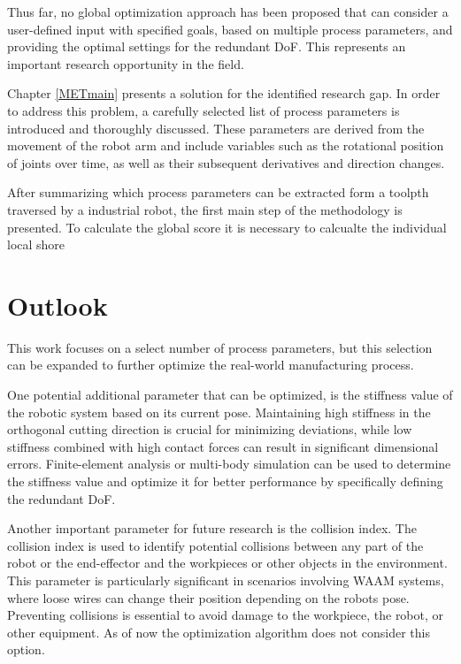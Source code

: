 Thus far, no global optimization approach has been proposed that can consider a user-defined input with specified goals, based on multiple process parameters, and providing the optimal settings for the redundant \acrshort{DoF}. This represents an important research opportunity in the field.

Chapter \ref{METmain} presents a solution for the identified research gap. In order to address this problem, a carefully selected list of process parameters is introduced and thoroughly discussed. These parameters are derived from the movement of the robot arm and include variables such as the rotational position of joints over time, as well as their subsequent derivatives and direction changes.

After summarizing which process parameters can be extracted form a toolpth traversed by a industrial robot, the first main step of the methodology is presented. To calculate the global score it is necessary to calcualte the individual local shore 

\newpage

\section{Outlook}%

This work focuses on a select number of process parameters, but this selection can be expanded to further optimize the real-world manufacturing process.

One potential additional parameter that can be optimized, is the stiffness value of the robotic system based on its current pose. Maintaining high stiffness in the orthogonal cutting direction is crucial for minimizing deviations, while low stiffness combined with high contact forces can result in significant dimensional errors. Finite-element analysis or multi-body simulation can be used to determine the stiffness value and optimize it for better performance by specifically defining the redundant \acrshort{DoF}.

Another important parameter for future research is the collision index. The collision index is used to identify potential collisions between any part of the robot or the end-effector and the workpieces or other objects in the environment. This parameter is particularly significant in scenarios involving \acrshort{WAAM} systems, where loose wires can change their position depending on the robots pose. Preventing collisions is essential to avoid damage to the workpiece, the robot, or other equipment. As of now the optimization algorithm does not consider this option.


